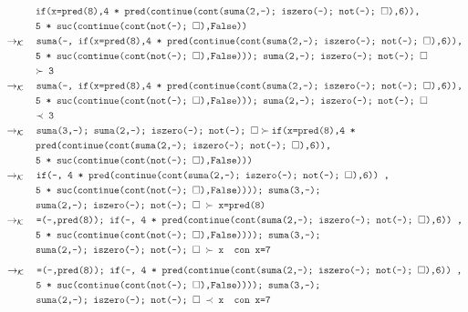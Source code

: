 \documentclass{article}
\newcommand{\tx}[1]{\textcolor{Black} {\texttt{#1}}}
\newcommand{\es}{$\square$}
\newcommand{\pop}[2]{ \tx{#1} \succ \tx{#2}}
\newcommand{\kr}{\rightarrow_{\mathcal{K}} \quad}
\begin{document}
\begin{enumerate}
\begin{enumerate}
\begin{align*}
			&\tx{\quad \quad \quad if(x=pred(8),4 * pred(continue(cont(suma(2,-); iszero(-); not(-); \es),6)),}\\
			&\tx{\quad \quad \quad 5 * suc(continue(cont(not(-); \es),False))}\\
			& \kr \tx{suma(-, if(x=pred(8),4 * pred(continue(cont(suma(2,-); iszero(-); not(-); \es),6)),}\\
			&\tx{\quad \quad \quad5 * suc(continue(cont(not(-); \es),False))); suma(2,-); iszero(-); not(-); \es}\\
			&\tx{\quad \quad \quad $\succ$ 3}\\
			& \kr \tx{suma(-, if(x=pred(8),4 * pred(continue(cont(suma(2,-); iszero(-); not(-); \es),6)),}\\
			&\tx{\quad \quad \quad 5 * suc(continue(cont(not(-); \es),False))); suma(2,-); iszero(-); not(-); \es}\\
			&\tx{\quad \quad \quad $\prec$ 3}\\
			&\kr \pop{suma(3,-); suma(2,-); iszero(-); not(-); \es}{if(x=pred(8),4 *}\\
			&\tx{\quad \quad \quad pred(continue(cont(suma(2,-); iszero(-); not(-); \es),6)),}\\
			&\tx{\quad \quad \quad 5 * suc(continue(cont(not(-); \es),False)))}\\
			&\kr \tx{if(-, 4 * pred(continue(cont(suma(2,-); iszero(-); not(-); \es),6)) ,}\\
			&\tx {\quad \quad \quad 5 * suc(continue(cont(not(-); \es),False)))); suma(3,-);}\\
			&\tx{\quad \quad \quad suma(2,-); iszero(-); not(-); \es $\ \succ $ x=pred(8)}\\
			&\kr \tx{=(-,pred(8)); if(-, 4 * pred(continue(cont(suma(2,-); iszero(-); not(-); \es),6)) ,}\\
			&\tx {\quad \quad \quad 5 * suc(continue(cont(not(-); \es),False)))); suma(3,-);}\\
			&\tx{\quad \quad \quad suma(2,-); iszero(-); not(-); \es $\ \succ $ x} \tx{\quad con x=7}\\
			\end{align*}
			\begin{align*}	
			&\kr \tx{=(-,pred(8)); if(-, 4 * pred(continue(cont(suma(2,-); iszero(-); not(-); \es),6)) ,}\\
			&\tx {\quad \quad \quad 5 * suc(continue(cont(not(-); \es),False)))); suma(3,-);}\\
			&\tx{\quad \quad \quad suma(2,-); iszero(-); not(-); \es $\ \prec $ x} \tx{\quad con x=7}\\	

\end{align*}
\end{enumerate}
\end{enumerate}
\end{document}
